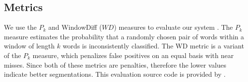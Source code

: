 \documentclass{article}
\begin{document}
\subsection{Metrics}\label{sec:metrk}
We use the $P_k$ and WindowDiff ($WD$) measures to evaluate our system \cite{beeferman-99,pevzner-02}. The $P_k$ measure estimates the probability that a randomly chosen pair of words within a window of length $k$ words is inconsistently classified. The WD metric is a variant of the $P_k$ measure, which penalizes false positives on an equal basis with near misses. Since both of these metrics are penalties, therefore the lower values indicate better segmentations. This evaluation source code is provided by \cite{eisenstein-08}.
%
\end{document}
